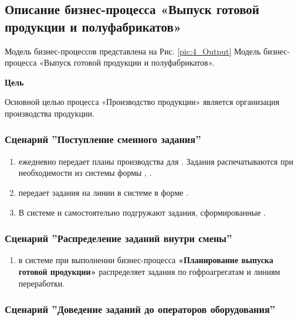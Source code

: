 \newpage
\subsection{Описание бизнес-процесса «Выпуск готовой продукции и полуфабрикатов»}
\label{bp:production}

Модель бизнес-процессов представлена на Рис. \ref{pic:4_Output} Модель бизнес-процесса «Выпуск готовой продукции и полуфабрикатов».

\textbf{Цель}

Основной целью процесса «Производство продукции» является организация производства продукции.

\subsubsection{Сценарий ''Поступление сменного задания''}
\label{bp:production_1}

\begin{enumerate}

\item 	\planner ежедневно  передает планы производства для \master. Задания распечатываются при необходимости из системы \gofro формы , .
\item 	\planner передает задания на линии в системе \gofro в форме .
\item В системе \gofro \operator и \gaoperator самостоятельно подгружают задания, сформированные \planner.
\end{enumerate}


\subsubsection{Сценарий ''Распределение заданий внутри смены''}
\label{bp:production_2}

\begin{enumerate}

\item 	\planner  в системе \gofro при выполнении бизнес-процесса \textbf{«Планирование выпуска готовой продукции»} распределяет задания по гофроагрегатам и линиям переработки.
\end{enumerate}



\subsubsection{Сценарий ''Доведение заданий до операторов оборудования''}
\label{bp:production_3}

